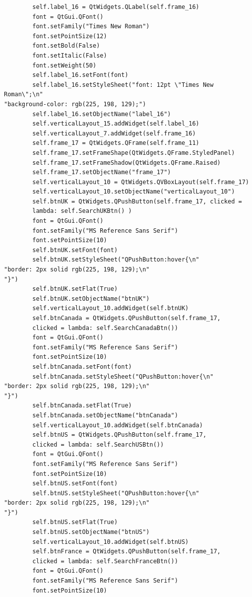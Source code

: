\documentclass[12pt]{article}
\begin{document}
\begin{verbatim}
        self.label_16 = QtWidgets.QLabel(self.frame_16)
        font = QtGui.QFont()
        font.setFamily("Times New Roman")
        font.setPointSize(12)
        font.setBold(False)
        font.setItalic(False)
        font.setWeight(50)
        self.label_16.setFont(font)
        self.label_16.setStyleSheet("font: 12pt \"Times New Roman\";\n"
"background-color: rgb(225, 198, 129);")
        self.label_16.setObjectName("label_16")
        self.verticalLayout_15.addWidget(self.label_16)
        self.verticalLayout_7.addWidget(self.frame_16)
        self.frame_17 = QtWidgets.QFrame(self.frame_11)
        self.frame_17.setFrameShape(QtWidgets.QFrame.StyledPanel)
        self.frame_17.setFrameShadow(QtWidgets.QFrame.Raised)
        self.frame_17.setObjectName("frame_17")
        self.verticalLayout_10 = QtWidgets.QVBoxLayout(self.frame_17)
        self.verticalLayout_10.setObjectName("verticalLayout_10")
        self.btnUK = QtWidgets.QPushButton(self.frame_17, clicked =
        lambda: self.SearchUKBtn() )
        font = QtGui.QFont()
        font.setFamily("MS Reference Sans Serif")
        font.setPointSize(10)
        self.btnUK.setFont(font)
        self.btnUK.setStyleSheet("QPushButton:hover{\n"
"border: 2px solid rgb(225, 198, 129);\n"
"}")
        self.btnUK.setFlat(True)
        self.btnUK.setObjectName("btnUK")
        self.verticalLayout_10.addWidget(self.btnUK)
        self.btnCanada = QtWidgets.QPushButton(self.frame_17, 
        clicked = lambda: self.SearchCanadaBtn())
        font = QtGui.QFont()
        font.setFamily("MS Reference Sans Serif")
        font.setPointSize(10)
        self.btnCanada.setFont(font)
        self.btnCanada.setStyleSheet("QPushButton:hover{\n"
"border: 2px solid rgb(225, 198, 129);\n"
"}")
        self.btnCanada.setFlat(True)
        self.btnCanada.setObjectName("btnCanada")
        self.verticalLayout_10.addWidget(self.btnCanada)
        self.btnUS = QtWidgets.QPushButton(self.frame_17, 
        clicked = lambda: self.SearchUSBtn())
        font = QtGui.QFont()
        font.setFamily("MS Reference Sans Serif")
        font.setPointSize(10)
        self.btnUS.setFont(font)
        self.btnUS.setStyleSheet("QPushButton:hover{\n"
"border: 2px solid rgb(225, 198, 129);\n"
"}")
        self.btnUS.setFlat(True)
        self.btnUS.setObjectName("btnUS")
        self.verticalLayout_10.addWidget(self.btnUS)
        self.btnFrance = QtWidgets.QPushButton(self.frame_17, 
        clicked = lambda: self.SearchFranceBtn())
        font = QtGui.QFont()
        font.setFamily("MS Reference Sans Serif")
        font.setPointSize(10)

\end{verbatim}
\end{document}
